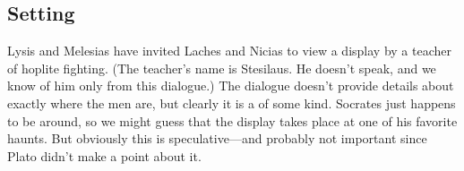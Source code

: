 \documentclass[11pt]{article}
\begin{document}
\subsection{Setting}

Lysis and Melesias have invited Laches and Nicias to view a display by a teacher of hoplite fighting.  (The teacher's name is Stesilaus.  He doesn't speak, and we know of him only from this dialogue.)  The dialogue doesn't provide details about exactly where the men are, but clearly it is a  of some kind.  Socrates just happens to be around, so we might guess that the display takes place at one of his favorite haunts.  But obviously this is speculative---and probably not important since Plato didn't make a point about it.


\newpage


\end{document}

